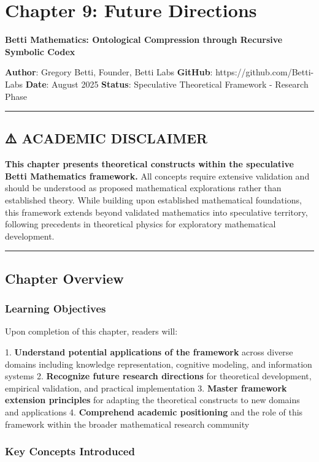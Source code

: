 \chapter{Chapter 9: Future Directions}

\textbf{Betti Mathematics: Ontological Compression through Recursive Symbolic Codex}

\textbf{Author}: Gregory Betti, Founder, Betti Labs  
\textbf{GitHub}: https://github.com/Betti-Labs  
\textbf{Date}: August 2025  
\textbf{Status}: Speculative Theoretical Framework - Research Phase

\hrule

\section{⚠️ ACADEMIC DISCLAIMER}

\textbf{This chapter presents theoretical constructs within the speculative Betti Mathematics framework.} All concepts require extensive validation and should be understood as proposed mathematical explorations rather than established theory. While building upon established mathematical foundations, this framework extends beyond validated mathematics into speculative territory, following precedents in theoretical physics for exploratory mathematical development.

\hrule

\section{Chapter Overview}

\subsection{Learning Objectives}

Upon completion of this chapter, readers will:

1. \textbf{Understand potential applications of the framework} across diverse domains including knowledge representation, cognitive modeling, and information systems
2. \textbf{Recognize future research directions} for theoretical development, empirical validation, and practical implementation
3. \textbf{Master framework extension principles} for adapting the theoretical constructs to new domains and applications
4. \textbf{Comprehend academic positioning} and the role of this framework within the broader mathematical research community

\subsection{Key Concepts Introduced}

